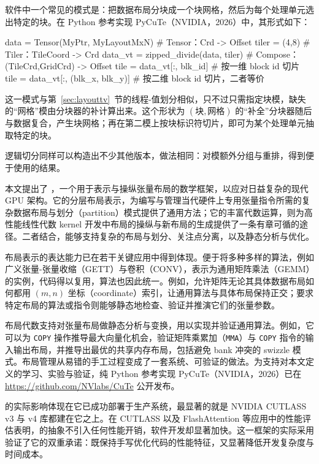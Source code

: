 软件中一个常见的模式是：把数据布局分块成一个块网格，然后为每个处理单元选出特定的块。在 Python 参考实现 PyCuTe（NVIDIA，2026）中，其形式如下：
\begin{python}
data    = Tensor(MyPtr, MyLayoutMxN)   # Tensor：Crd -> Offset
tiler   = (4,8)                        # Tiler：TileCoord -> Crd
data_vt = zipped_divide(data, tiler)   # Compose：(TileCrd,GridCrd) -> Offset
tile    = data_vt[:, blk_id]           # 按一维 block id 切片
tile    = data_vt[:, (blk_x, blk_y)]   # 按二维 block id 切片，二者等价
\end{python}
这一模式与第~\ref{sec:layouttv}~节的线程-值划分相似，只不过只需指定块模，缺失的“网格”模由分块器的补计算出来。这个形状为 $(\text{块}, \text{网格})$ 的“补全”分块器随后与数据复合，产生块网格；再在第二模上按块标识符切片，即可为某个处理单元抽取特定的块。

逻辑切分同样可以构造出不少其他版本，做法相同：对模额外分组与重排，得到便于使用的结果。


本文提出了 \CuTe，一个用于表示与操纵张量布局的数学框架，以应对日益复杂的现代 GPU 架构。它的分层布局表示，为编写与管理当代硬件上专用张量指令所需的复杂数据布局与划分（partition）模式提供了通用方法；它的丰富代数运算，则为高性能线性代数 kernel 开发中布局的操纵与新布局的生成提供了一条有章可循的途径。二者结合，能够支持复杂的布局与划分、关注点分离，以及静态分析与优化。

\CuTe 布局表示的表达能力已在若干关键应用中得到体现。\CuTe 便于将多种多样的算法，例如广义张量-张量收缩（GETT）与卷积（CONV），表示为通用矩阵乘法（GEMM）的实例，代码得以复用，算法也因此统一。例如，\CuTe 允许矩阵无论其具体数据布局如何都用 $(m,n)$ 坐标（coordinate）索引，让通用算法与具体布局保持正交；要求特定布局的算法或指令则能够静态地检查、验证并推演它们的张量参数。

\CuTe 布局代数支持对张量布局做静态分析与变换，用以实现并验证通用算法。例如，它可以为 \texttt{COPY} 操作推导最大向量化机会，验证矩阵乘累加（\texttt{MMA}）与 \texttt{COPY} 指令的输入输出布局，并推导出最优的共享内存布局，包括避免 bank 冲突的 swizzle 模式。布局管理从易错的手工过程变成了一套系统、可验证的做法。为支持对本文定义的学习、实验与验证，纯 Python 参考实现 PyCuTe（NVIDIA，2026）已在 \url{https://github.com/NVlabs/CuTe} 公开发布。

\CuTe 的实际影响体现在它已成功部署于生产系统，最显著的就是 NVIDIA CUTLASS v3 与 v4 库都建在它之上。在 CUTLASS 以及 FlashAttention 等应用中的性能评估表明，\CuTe 的抽象不引入任何性能开销，软件开发却显著加快。这一框架的实际采用验证了它的双重承诺：既保持手写优化代码的性能特征，又显著降低开发复杂度与时间成本。


